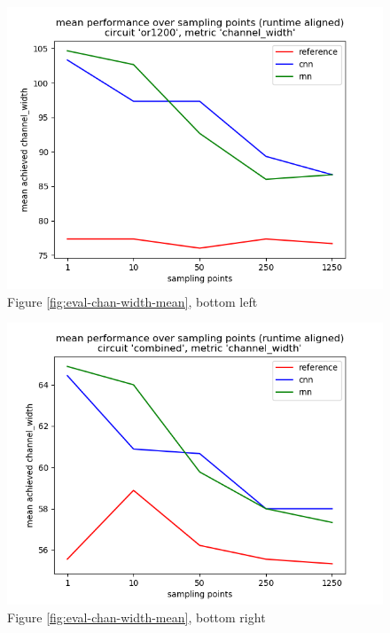 \begin{figure}[H]
	\includegraphics[width=\linewidth]{plots/eval-or1200-chan-width-mean-full.png}
	\caption{Figure \ref{fig:eval-chan-width-mean}, bottom left}
\end{figure}

\begin{figure}[H]
	\includegraphics[width=\linewidth]{plots/eval-combined-chan-width-mean-full.png}
	\caption{Figure \ref{fig:eval-chan-width-mean}, bottom right}
\end{figure}

